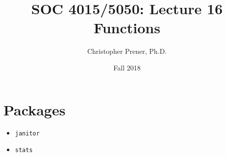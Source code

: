 \documentclass{tufte-handout}
\title{SOC 4015/5050: Lecture 16 Functions}
\author{Christopher Prener, Ph.D.}
\date{Fall 2018}
\begin{document}
\maketitle %

\vspace{5mm}
\section{Packages}
\begin{itemize}
\item \texttt{janitor}
\item \texttt{stats}
\end{itemize}

\vspace{5mm}
\end{document}
